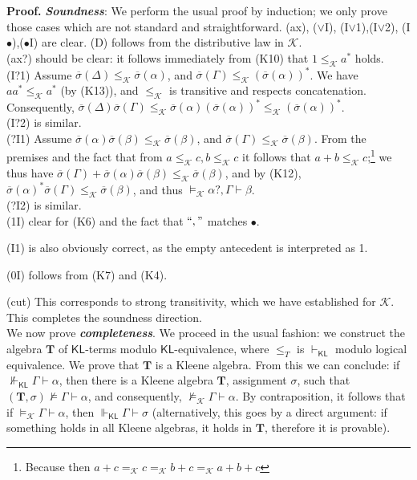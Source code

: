 \documentclass{eptcs}
\newcommand{\proofbeg}{\textbf{Proof. }}
\newcommand{\KA}{\mathcal{K}}
\newcommand{\osigma}{\overline{\sigma}}
\newcommand{\KL}{\mathsf{KL}}
\begin{document}
\proofbeg
\textit{\textbf{Soundness}}: We perform the usual proof by induction; 
we only prove those
cases which are not standard and straightforward. 
(ax), ($\vee$I), (I$\vee$1),(I$\vee$2),
(I$\bullet$),($\bullet$I) are clear.
(D) follows from the distributive law in $\KA$.
\\

(ax?) should be clear: it follows immediately from (K10) 
that $1\leq_\KA a^*$ holds.
\\

(I?1) 
Assume $\osigma(\Delta)\leq_\KA \osigma(\alpha)$, and 
$\osigma(\Gamma)\leq_\KA(\osigma(\alpha))^*$. 
We have $aa^*\leq_\KA a^*$ (by (K13)), and $\leq_\KA$ is transitive and
respects concatenation. Consequently, 
$\osigma(\Delta)\osigma(\Gamma)\leq_\KA \osigma(\alpha)(\osigma(\alpha))^*
\leq_\KA (\osigma(\alpha))^*$.
\\

(I?2) is similar.
\\

(?I1) 
Assume $\osigma(\alpha)\osigma(\beta)\leq_\KA\osigma(\beta)$, and
$\osigma(\Gamma)\leq_\KA\osigma(\beta)$.
From the premises and the fact that from $a\leq_\KA c,b\leq_\KA c$ it follows
that $a+b\leq_\KA c$;\footnote{Because 
then $a+c=_\KA c=_\KA b+c=_\KA a+b+c$} we thus have
$\osigma(\Gamma)+\osigma(\alpha)\osigma(\beta)\leq_\KA \osigma(\beta)$,
and by (K12),
$\osigma(\alpha)^*\osigma(\Gamma)\leq_\KA \osigma(\beta)$, and thus
$\models_\KA \alpha?,\Gamma\vdash\beta$.
\\

(?I2) is similar.
\\





(1I) clear for (K6) and the fact that $``,"$ matches $\bullet$.

(I1) is also obviously correct, as the empty antecedent is interpreted as
1.

(0I) follows from (K7) and (K4). 

(cut) This corresponds to strong transitivity, which we have established for
$\KA$.
\\

This completes the soundness direction. 
\\

We now prove \textbf{\textit{completeness}}. We proceed in the usual fashion:
we construct the algebra $\textbf{T}$ of $\KL$-terms modulo $\KL$-equivalence, 
where $\leq_T$ is $\vdash_{\KL}$ modulo logical equivalence. We prove that 
$\textbf{T}$ is a Kleene algebra. From this we can conclude: if 
$\not\Vdash_{\KL}\Gamma\vdash\alpha$, then 
there is a Kleene algebra $\textbf{T}$, 
assignment $\sigma$, such  that 
$(\textbf{T},\sigma)\not\models\Gamma\vdash\alpha$,
and consequently, $\not\models_\KA\Gamma\vdash\alpha$. By
contraposition, it follows that if $\models_\KA\Gamma\vdash\alpha$,
then $\Vdash_{\KL}\Gamma\vdash\sigma$ (alternatively, this goes by a
direct argument: if something holds in all Kleene algebras, it holds
in $\textbf{T}$, therefore it is provable).
\end{document}
